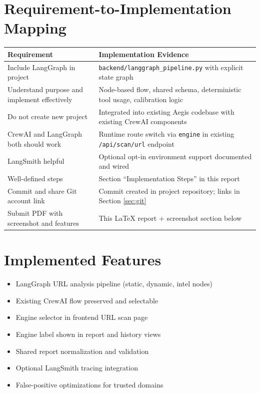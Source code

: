 \documentclass[11pt,a4paper]{article}
\begin{document}
\section{Requirement-to-Implementation Mapping}
\begin{longtable}{|>{\raggedright\arraybackslash}p{}|>{\raggedright\arraybackslash}p{}|}
\hline
\textbf{Requirement} & \textbf{Implementation Evidence} \\
\hline
Include LangGraph in project & \texttt{backend/langgraph\_pipeline.py} with explicit state graph \\
\hline
Understand purpose and implement effectively & Node-based flow, shared schema, deterministic tool usage, calibration logic \\
\hline
Do not create new project & Integrated into existing Aegis codebase with existing CrewAI components \\
\hline
CrewAI and LangGraph both should work & Runtime route switch via \texttt{engine} in existing \texttt{/api/scan/url} endpoint \\
\hline
LangSmith helpful & Optional opt-in environment support documented and wired \\
\hline
Well-defined steps & Section ``Implementation Steps'' in this report \\
\hline
Commit and share Git account link & Commit created in project repository; links in Section \ref{sec:git} \\
\hline
Submit PDF with screenshot and features & This \LaTeX{} report + screenshot section below \\
\hline
\end{longtable}

\section{Implemented Features}
\begin{itemize}[leftmargin=1.25em]
  \item LangGraph URL analysis pipeline (static, dynamic, intel nodes)
  \item Existing CrewAI flow preserved and selectable
  \item Engine selector in frontend URL scan page
  \item Engine label shown in report and history views
  \item Shared report normalization and validation
  \item Optional LangSmith tracing integration
  \item False-positive optimizations for trusted domains
\end{itemize}
\end{document}
